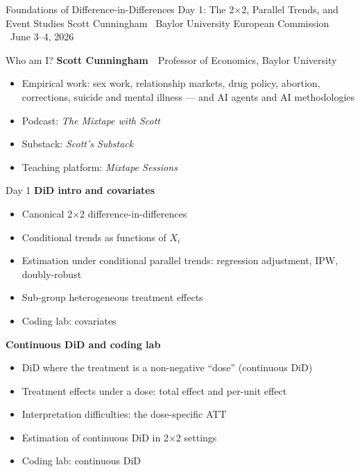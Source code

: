 \documentclass[aspectratio=169,11pt]{beamer}
\begin{document}
\codechellatitle
  {Foundations of Difference-in-Differences}
  {Day 1: The 2$\times$2, Parallel Trends, and Event Studies}
  {Scott Cunningham \textperiodcentered\ Baylor University}
  {European Commission \textperiodcentered\ June 3--4, 2026}




\begin{frame}{Who am I?}
\vspace{0.5em}
\textbf{Scott Cunningham} \,\textperiodcentered\, Professor of Economics, Baylor University
\vspace{0.8em}
\begin{itemize}
  \item Empirical work: sex work, relationship markets, drug policy, abortion, corrections, suicide and mental illness --- and AI agents and AI methodologies
  \item Podcast: \textit{The Mixtape with Scott}
  \item Substack: \textit{Scott's Substack}
  \item Teaching platform: \textit{Mixtape Sessions}
\end{itemize}
\end{frame}

\begin{frame}{Day 1}
\vspace{0.3em}
{\large{} \quad\textbf{DiD intro and covariates}}
\begin{itemize}\setlength{\itemsep}{0.1em}\small
  \item Canonical 2$\times$2 difference-in-differences
  \item Conditional trends as functions of $X_i$
  \item Estimation under conditional parallel trends: regression adjustment, IPW, doubly-robust
  \item Sub-group heterogeneous treatment effects
  \item Coding lab: covariates
\end{itemize}
\vspace{0.4em}
{\large{} \quad\textbf{Continuous DiD and coding lab}}
\begin{itemize}\setlength{\itemsep}{0.15em}\small
  \item DiD where the treatment is a non-negative ``dose'' (continuous DiD)
  \item Treatment effects under a dose: total effect and per-unit effect
  \item Interpretation difficulties: the dose-specific ATT
  \item Estimation of continuous DiD in 2$\times$2 settings
  \item Coding lab: continuous DiD
\end{itemize}
\end{frame}
\end{document}
